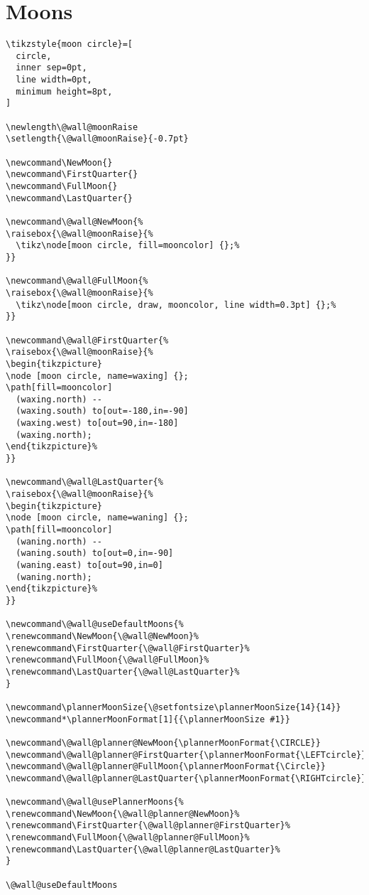 \documentclass[11pt,oneside]{memoir-article}
\begin{document}
\section{Moons}
\label{sec:org711444c}

\begin{verbatim}
\tikzstyle{moon circle}=[
  circle,
  inner sep=0pt,
  line width=0pt,
  minimum height=8pt,
]

\newlength\@wall@moonRaise
\setlength{\@wall@moonRaise}{-0.7pt}

\newcommand\NewMoon{}
\newcommand\FirstQuarter{}
\newcommand\FullMoon{}
\newcommand\LastQuarter{}

\newcommand\@wall@NewMoon{%
\raisebox{\@wall@moonRaise}{%
  \tikz\node[moon circle, fill=mooncolor] {};%
}}

\newcommand\@wall@FullMoon{%
\raisebox{\@wall@moonRaise}{%
  \tikz\node[moon circle, draw, mooncolor, line width=0.3pt] {};%
}}

\newcommand\@wall@FirstQuarter{%
\raisebox{\@wall@moonRaise}{%
\begin{tikzpicture}
\node [moon circle, name=waxing] {};
\path[fill=mooncolor]
  (waxing.north) --
  (waxing.south) to[out=-180,in=-90]
  (waxing.west) to[out=90,in=-180]
  (waxing.north);
\end{tikzpicture}%
}}

\newcommand\@wall@LastQuarter{%
\raisebox{\@wall@moonRaise}{%
\begin{tikzpicture}
\node [moon circle, name=waning] {};
\path[fill=mooncolor]
  (waning.north) --
  (waning.south) to[out=0,in=-90]
  (waning.east) to[out=90,in=0]
  (waning.north);
\end{tikzpicture}%
}}

\newcommand\@wall@useDefaultMoons{%
\renewcommand\NewMoon{\@wall@NewMoon}%
\renewcommand\FirstQuarter{\@wall@FirstQuarter}%
\renewcommand\FullMoon{\@wall@FullMoon}%
\renewcommand\LastQuarter{\@wall@LastQuarter}%
}

\newcommand\plannerMoonSize{\@setfontsize\plannerMoonSize{14}{14}}
\newcommand*\plannerMoonFormat[1]{{\plannerMoonSize #1}}

\newcommand\@wall@planner@NewMoon{\plannerMoonFormat{\CIRCLE}}
\newcommand\@wall@planner@FirstQuarter{\plannerMoonFormat{\LEFTcircle}}
\newcommand\@wall@planner@FullMoon{\plannerMoonFormat{\Circle}}
\newcommand\@wall@planner@LastQuarter{\plannerMoonFormat{\RIGHTcircle}}

\newcommand\@wall@usePlannerMoons{%
\renewcommand\NewMoon{\@wall@planner@NewMoon}%
\renewcommand\FirstQuarter{\@wall@planner@FirstQuarter}%
\renewcommand\FullMoon{\@wall@planner@FullMoon}%
\renewcommand\LastQuarter{\@wall@planner@LastQuarter}%
}

\@wall@useDefaultMoons
\end{verbatim}
\end{document}
